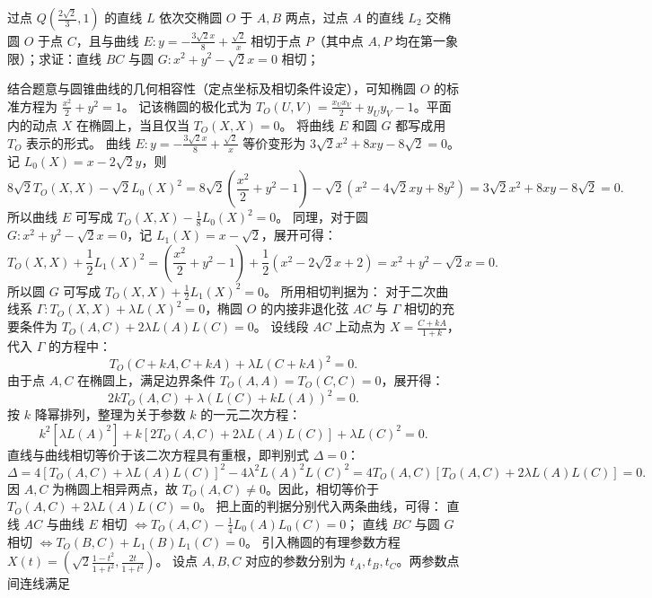 \begin{example}
过点 \(Q\left(\frac{2\sqrt{2}}{3},1\right)\) 的直线 \(L\) 依次交椭圆 \(O\) 于 \(A,B\) 两点，过点 \(A\) 的直线 \(L_2\) 交椭圆 \(O\) 于点 \(C\)，且与曲线 \(E: y = -\frac{3\sqrt{2}x}{8} + \frac{\sqrt{2}}{x}\) 相切于点 \(P\)（其中点 \(A,P\) 均在第一象限）；求证：直线 \(BC\) 与圆 \(G: x^2 + y^2 - \sqrt{2}x = 0\) 相切；
\end{example}
\begin{solution}
结合题意与圆锥曲线的几何相容性（定点坐标及相切条件设定），可知椭圆 $O$ 的标准方程为 $\frac{x^2}{2} + y^2 = 1$。
记该椭圆的极化式为 $T_O(U, V) = \frac{x_U x_V}{2} + y_U y_V - 1$。平面内的动点 $X$ 在椭圆上，当且仅当 $T_O(X, X) = 0$。
将曲线 $E$ 和圆 $G$ 都写成用 $T_O$ 表示的形式。
曲线 $E: y = -\frac{3\sqrt{2}x}{8} + \frac{\sqrt{2}}{x}$ 等价变形为 $3\sqrt{2}x^2 + 8xy - 8\sqrt{2} = 0$。
记 $L_0(X) = x - 2\sqrt{2}y$，则
\[ 8\sqrt{2} T_O(X, X) - \sqrt{2} L_0(X)^2 = 8\sqrt{2}\left(\frac{x^2}{2} + y^2 - 1\right) - \sqrt{2}(x^2 - 4\sqrt{2}xy + 8y^2) = 3\sqrt{2}x^2 + 8xy - 8\sqrt{2} = 0. \]
所以曲线 $E$ 可写成 $T_O(X, X) - \frac{1}{8} L_0(X)^2 = 0$。
同理，对于圆 $G: x^2 + y^2 - \sqrt{2}x = 0$，记 $L_1(X) = x - \sqrt{2}$，展开可得：
\[ T_O(X, X) + \frac{1}{2} L_1(X)^2 = \left(\frac{x^2}{2} + y^2 - 1\right) + \frac{1}{2}(x^2 - 2\sqrt{2}x + 2) = x^2 + y^2 - \sqrt{2}x = 0. \]
所以圆 $G$ 可写成 $T_O(X, X) + \frac{1}{2} L_1(X)^2 = 0$。
所用相切判据为：
对于二次曲线系 $\Gamma: T_O(X,X) + \lambda L(X)^2 = 0$，椭圆 $O$ 的内接非退化弦 $AC$ 与 $\Gamma$ 相切的充要条件为 $T_O(A,C) + 2\lambda L(A)L(C) = 0$。
设线段 $AC$ 上动点为 $X = \frac{C + k A}{1+k}$，代入 $\Gamma$ 的方程中：
\[ T_O(C+kA, C+kA) + \lambda L(C+kA)^2 = 0. \]
由于点 $A, C$ 在椭圆上，满足边界条件 $T_O(A,A) = T_O(C,C) = 0$，展开得：
\[ 2k T_O(A,C) + \lambda (L(C) + k L(A))^2 = 0. \]
按 $k$ 降幂排列，整理为关于参数 $k$ 的一元二次方程：
\[ k^2 [ \lambda L(A)^2 ] + k [ 2T_O(A,C) + 2\lambda L(A)L(C) ] + \lambda L(C)^2 = 0. \]
直线与曲线相切等价于该二次方程具有重根，即判别式 $\Delta = 0$：
\[ \Delta = 4 [ T_O(A,C) + \lambda L(A)L(C) ]^2 - 4 \lambda^2 L(A)^2 L(C)^2 = 4 T_O(A,C) [ T_O(A,C) + 2\lambda L(A)L(C) ] = 0. \]
因 $A, C$ 为椭圆上相异两点，故 $T_O(A,C) \neq 0$。因此，相切等价于 $T_O(A,C) + 2\lambda L(A)L(C) = 0$。
把上面的判据分别代入两条曲线，可得：
直线 $AC$ 与曲线 $E$ 相切 $\iff T_O(A, C) - \frac{1}{4}L_0(A)L_0(C) = 0$；
直线 $BC$ 与圆 $G$ 相切 $\iff T_O(B, C) + L_1(B)L_1(C) = 0$。
引入椭圆的有理参数方程 $X(t) = \left( \sqrt{2} \frac{1-t^2}{1+t^2}, \frac{2t}{1+t^2} \right)$。
设点 $A, B, C$ 对应的参数分别为 $t_A, t_B, t_C$。两参数点间连线满足

\end{solution}
